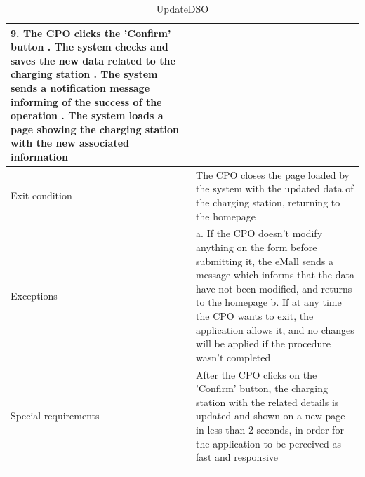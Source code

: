 \begin{center}
\begin{longtable}{p{4cm} p{11cm}}
                    9. The CPO clicks the 'Confirm' button \newline
                    10. The system checks and saves the new data related to the charging station \newline
                    11. The system sends a notification message informing of the success of the operation \newline
                    12. The system loads a page showing the charging station with the new associated information\\
     \hline
     Exit condition &  The CPO closes the page loaded by the system with the updated data of the charging station, returning to the homepage \\
     \hline
     Exceptions &   a. If the CPO doesn't modify anything on the form before submitting it, the eMall sends a                       message which informs that the data have not been modified, and returns to the homepage \newline
                    b. If at any time the CPO wants to exit, the application allows it, and no changes will be applied if the procedure wasn't completed \\
     \hline
     Special requirements & After the CPO clicks on the 'Confirm' button, the charging station with the related details is updated and shown on a new page in less than 2 seconds, in order for the application to be perceived as fast and responsive \\
     \hline
    \caption{UpdateDSO}
    \label{tab:UpdateDSO}
    \end{longtable}
\end{center}

